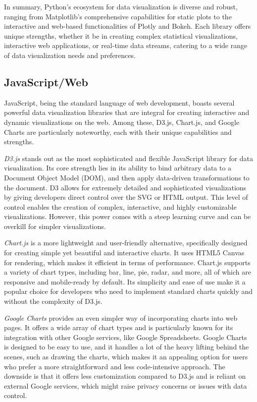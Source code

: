 In summary, Python's ecosystem for data visualization is diverse and robust, ranging from Matplotlib's comprehensive capabilities for static plots to the interactive and web-based functionalities of Plotly and Bokeh. Each library offers unique strengths, whether it be in creating complex statistical visualizations, interactive web applications, or real-time data streams, catering to a wide range of data visualization needs and preferences.

\subsection*{JavaScript/Web}

JavaScript, being the standard language of web development, boasts several powerful data visualization libraries that are integral for creating interactive and dynamic visualizations on the web. Among these, D3.js, Chart.js, and Google Charts are particularly noteworthy, each with their unique capabilities and strengths.

\emph{D3.js} stands out as the most sophisticated and flexible JavaScript library for data visualization. Its core strength lies in its ability to bind arbitrary data to a Document Object Model (DOM), and then apply data-driven transformations to the document. D3 allows for extremely detailed and sophisticated visualizations by giving developers direct control over the SVG or HTML output. This level of control enables the creation of complex, interactive, and highly customizable visualizations. However, this power comes with a steep learning curve and can be overkill for simpler visualizations.

\emph{Chart.js} is a more lightweight and user-friendly alternative, specifically designed for creating simple yet beautiful and interactive charts. It uses HTML5 Canvas for rendering, which makes it efficient in terms of performance. Chart.js supports a variety of chart types, including bar, line, pie, radar, and more, all of which are responsive and mobile-ready by default. Its simplicity and ease of use make it a popular choice for developers who need to implement standard charts quickly and without the complexity of D3.js.

\emph{Google Charts} provides an even simpler way of incorporating charts into web pages. It offers a wide array of chart types and is particularly known for its integration with other Google services, like Google Spreadsheets. Google Charts is designed to be easy to use, and it handles a lot of the heavy lifting behind the scenes, such as drawing the charts, which makes it an appealing option for users who prefer a more straightforward and less code-intensive approach. The downside is that it offers less customization compared to D3.js and is reliant on external Google services, which might raise privacy concerns or issues with data control.

